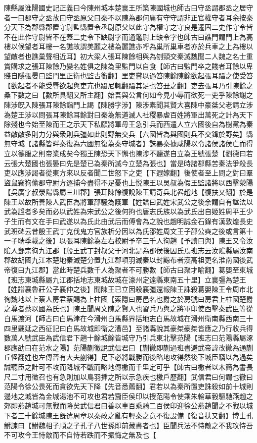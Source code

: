 陳縣屬淮陽國史記正義曰今陳州城本楚襄王所築陳國城也師古曰守丞謂郡丞之居守者一曰郡守之丞故曰守丞原父曰秦不以陳為郡何庸有守守謂非正官權守者耳余按秦分天下為郡縣郡置守尉監縣置令丞尉原父以此守為權守之守良是遷固二史作守令皆不在此作守尉皆不在蓋二史令下缺尉字而通鑑尉上缺令字也師古曰譙門謂門上為高樓以候望者耳樓一名譙故謂美麗之樓為麗譙亦呼為巢所巢車者亦於兵車之上為樓以望敵者也譙巢聲相近耳】初大梁人張耳陳餘相與為刎頸交秦滅魏聞二人魏之名士重賞購求之張耳陳餘乃變名姓俱之陳為里監門以自食【師古曰監門卒之賤者耳餘以卑賤自隱張晏曰監門里正衛也監古銜翻】里吏嘗以過笞陳餘陳餘欲起張耳躡之使受笞【欲起者不能受辱欲起與吏亢也躡尼輒翻躡其足也笞丑之翻】吏去張耳乃引陳餘之桑下數之曰【數所具翻又所主翻】始吾與公言何如今見小辱而欲死一吏乎陳餘謝之陳涉旣入陳張耳陳餘詣門上謁【陳勝字涉】陳涉素聞其賢大喜陳中豪桀父老請立涉為楚王涉以問張耳陳餘耳餘對曰秦為無道滅人社稷暴虐百姓將軍出萬死之計為天下除殘也今始至陳而王之示天下私願將軍毋王急引兵而西遣人立六國後自為樹黨為秦益敵敵多則力分與衆則兵彊如此則野無交兵【六國皆為與國則兵不交鋒於野矣】縣無守城【諸縣皆畔秦復為六國無復為秦守城者】誅暴秦據咸陽以令諸侯諸侯亡而得立以德服之則帝業成矣今獨王陳恐天下懈也陳涉不聽遂自立為王號張楚【劉德曰若云張大楚國也張晏曰先是楚已為秦所滅今立楚為張也】當是時諸郡縣苦秦法爭殺長吏以應涉謁者從東方來以反者聞二世怒下之吏【下遐嫁翻】後使者至上問之對曰羣盜鼠竊狗偷郡守尉方逐捕今盡得不足憂也上悦陳王以吳叔為假王監諸將以西擊滎陽【吳廣字叔滎陽縣屬三川郡】張耳陳餘復說陳王請奇兵北畧趙地【復扶又翻】於是陳王以故所善陳人武臣為將軍邵騷為護軍【姓譜曰武姓宋武公之後余謂自有諡法以武為諡者多矣而必以武姓為宋武公之後何拘也唐志氏族以為武氏出自姬姓周平王少子生而有文在手曰武遂以為氏此由武后而傅會為之說也趙明誠金石錄有漢敦煌長史武班碑云昔殷王武丁克伐鬼方官族析分因以為氏邵姓周文王子邵公奭之後或言第十一子聃季載之後】以張耳陳餘為左右校尉予卒三千人徇趙【予讀曰與】陳王又令汝隂人鄧宗徇九江郡【殷王武丁封叔父于河北是為鄧侯後因氏焉班志云汝隂縣屬汝南郡故胡國九江本楚地秦滅楚分置九江郡項羽滅秦以封黥布者漢高祖更名淮南國後武帝復曰九江郡】當此時楚兵數千人為聚者不可勝數【師古曰聚才喻翻】葛嬰至東城【班志東城縣屬九江郡括地志東城故城在濠州定遠縣東南五十里】立襄彊為楚王【姓譜襄魯莊公子襄仲之後】聞陳王已立因殺襄彊還報陳王誅殺葛嬰陳王令周市北徇魏地以上蔡人房君蔡賜為上柱國【索隱曰房邑名也爵之於房號曰房君上柱國楚爵之尊者蔡以國為氏也】陳王聞周文陳之賢人也習兵乃與之將軍印使西擊秦武臣等從白馬渡河【師古曰白馬津在今滑州白馬縣界括地志白馬故城在滑州衛南縣西南三十四里戴延之西征記曰白馬故城即衛之漕邑】至諸縣說其豪桀豪桀皆應之乃行收兵得數萬人號武臣為武信君下趙十餘城餘皆城守乃引兵東北擊范陽【班志曰范陽縣屬涿郡應劭曰在范水之陽】范陽蒯徹說武信君曰【蒯徹即蒯過班書避武帝諱改徹為通蒯丘怪翻姓也左傳晉有大夫蒯得】足下必將戰勝而後略地攻得然後下城臣竊以為過矣誠聽臣之計可不攻而降城不戰而略地傳檄而千里定可乎【師古曰檄者以木簡為書長尺二寸用徵召也有急則加以鳥羽挿之所以示急疾也檄戶歷翻】武信君曰何謂也徹曰范陽令徐公畏死而貪欲先天下降【先音悉薦翻】君若以為秦所置吏誅殺如前十城則邊地之城皆為金城湯池不可攻也君若齎臣侯印以授范陽令使乘朱輪華轂驅馳燕趙之郊即燕趙城可無戰而降矣武信君曰善以車百乘騎二百侯印迎徐公燕趙聞之不戰以城下者三十餘城陳王旣遣周章以秦政之亂有輕秦之意不復設備【復音扶又翻】博士孔鮒諫曰【鮒魏相子順之子孔子八世孫即前藏書者也】臣聞兵法不恃敵之不我攻恃吾不可攻今王恃敵而不自恃若跌而不振悔之無及也【